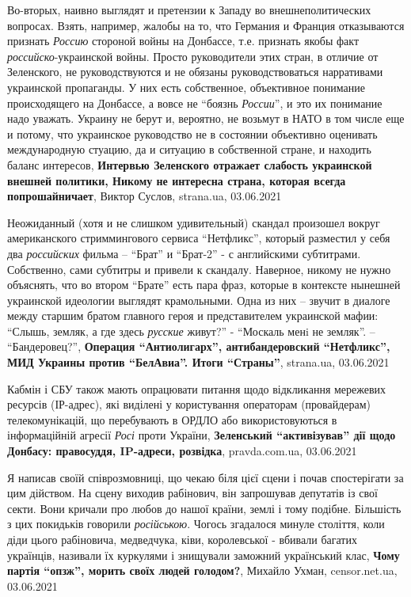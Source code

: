 Во-вторых, наивно выглядят и претензии к Западу во внешнеполитических вопросах.
Взять, например, жалобы на то, что Германия и Франция отказываются признать
\emph{Россию} стороной войны на Донбассе, т.е. признать якобы факт
\emph{российско}-украинской войны. Просто руководители этих стран, в отличие от
Зеленского, не руководствуются и не обязаны руководствоваться нарративами
украинской пропаганды. У них есть собственное, объективное понимание
происходящего на Донбассе, а вовсе не \enquote{боязнь \emph{России}}, и это их понимание надо
уважать. Украину не берут и, вероятно, не возьмут в НАТО в том числе еще и
потому, что украинское руководство не в состоянии объективно оценивать
международную стуацию, да и ситуацию в собственной стране, и находить баланс
интересов, 
\textbf{Интервью Зеленского отражает слабость украинской внешней политики,
Никому не интересна страна, которая всегда попрошайничает}, Виктор Суслов,
strana.ua, 03.06.2021

Неожиданный (хотя и не слишком удивительный) скандал произошел вокруг
американского стриммингового сервиса \enquote{Нетфликс}, который разместил у себя два
\emph{российских} фильма – \enquote{Брат} и \enquote{Брат-2} - с английскими субтитрами. Собственно,
сами субтитры и привели к скандалу. Наверное, никому не нужно объяснять, что
во втором \enquote{Брате} есть пара фраз, которые в контексте нынешней украинской
идеологии выглядят крамольными. Одна из них – звучит в диалоге между старшим
братом главного героя и представителем украинской мафии: \enquote{Слышь, земляк, а где
здесь \emph{русские} живут?} - \enquote{Москаль менi не земляк}. – \enquote{Бандеровец?},
\textbf{Операция \enquote{Антиолигарх}, антибандеровский \enquote{Нетфликс},
МИД Украины против \enquote{БелАвиа}. Итоги \enquote{Страны}}, strana.ua,
03.06.2021


Кабмін і СБУ також мають опрацювати питання щодо відкликання мережевих ресурсів
(ІР-адрес), які виділені у користування операторам (провайдерам)
телекомунікацій, що перебувають в ОРДЛО або використовуються в інформаційній
агресії \emph{Росі} проти України,
\textbf{Зеленський \enquote{активізував} дії щодо Донбасу: правосуддя, IP-адреси, розвідка},
pravda.com.ua, 03.06.2021

Я написав своїй співрозмовниці, що чекаю біля цієї сцени і почав спостерігати
за цим дійством.  На сцену виходив рабінович, він запрошував депутатів із свої
секти. Вони кричали про любов до нашої країни, землі і тому подібне. Більшість
з цих покидьків говорили \emph{російською}.  Чогось згадалося минуле століття, коли
діди цього рабіновича, медведчука, ківи, королевської - вбивали багатих
українців, називали їх куркулями і знищували заможний український клас,
\textbf{Чому партія \enquote{опзж}, морить своїх людей голодом?}, 
Михайло Ухман, censor.net.ua, 03.06.2021

